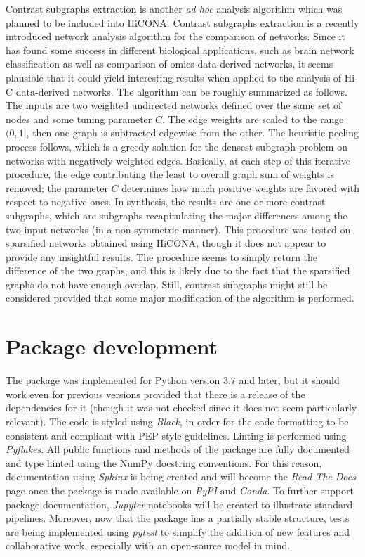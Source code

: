 Contrast subgraphs extraction is another \textit{ad hoc} analysis algorithm which was planned to be included into HiCONA. Contrast subgraphs extraction is a recently introduced network analysis algorithm for the comparison of networks. Since it has found some success in different biological applications, such as brain network classification as well as comparison of omics data-derived networks\cite{contrast2020, contrast2023}, it seems plausible that it could yield interesting results when applied to the analysis of Hi-C data-derived networks. The algorithm can be roughly summarized as follows. The inputs are two weighted undirected networks defined over the same set of nodes and some tuning parameter $C$. The edge weights are scaled to the range $(0,1]$, then one graph is subtracted edgewise from the other. The heuristic peeling process follows, which is a greedy solution for the densest subgraph problem on networks with negatively weighted edges. Basically, at each step of this iterative procedure, the edge contributing the least to overall graph sum of weights is removed; the parameter $C$ determines how much positive weights are favored with respect to negative ones. In synthesis, the results are one or more contrast subgraphs, which are subgraphs recapitulating the major differences among the two input networks (in a non-symmetric manner). This procedure was tested on sparsified networks obtained using HiCONA, though it does not appear to provide any insightful results. The procedure seems to simply return the difference of the two graphs, and this is likely due to the fact that the sparsified graphs do not have enough overlap. Still, contrast subgraphs might still be considered provided that some major modification of the algorithm is performed.


\section{Package development}

The package was implemented for Python version 3.7 and later, but it should work even for previous versions provided that there is a release of the dependencies for it (though it was not checked since it does not seem particularly relevant). 
The code is styled using \textit{Black}\cite{black2023}, in order for the code formatting to be consistent and compliant with PEP style guidelines\cite{pep2023}. Linting is performed using \textit{Pyflakes}\cite{pyflakes2023}.
All public functions and methods of the package are fully documented and type hinted using the NumPy docstring conventions. For this reason, documentation using \textit{Sphinx}\cite{sphinx2023} is being created and will become the \textit{Read The Docs} page once the package is made available on \textit{PyPI} and \textit{Conda}.
To further support package documentation, \textit{Jupyter}\cite{jupyter2023} notebooks will be created to illustrate standard pipelines. Moreover, now that the package has a partially stable structure, tests are being implemented using \textit{pytest}\cite{pytest2023} to simplify the addition of new features and collaborative work, especially with an open-source model in mind.

